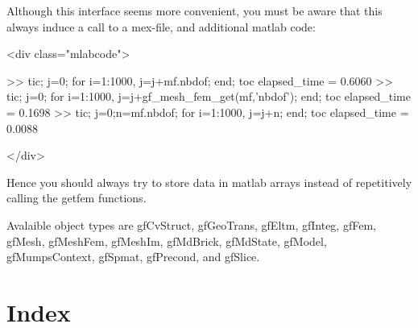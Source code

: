 \documentclass[11pt,a4paper]{article}
\newcommand{\hypertarget}[1]{\label{#1}}
\newcommand{\sf}[1]{#1}
\newenvironment{matlab}{\begin{rawxml}<div class="mlabcode">\end{rawxml}\begin{example}}{\end{example}\begin{rawxml}</div>\end{rawxml}}
\newenvironment{matlab}{\begin{alltt}}{\end{alltt}}
\newcommand{\mlab}{{\sf matlab}\xspace}
\begin{document}
Although this interface seems more convenient, you must be aware that this
always induce a call to a mex-file, and additional \mlab code:
\begin{matlab}
>> tic; j=0; for i=1:1000, j=j+mf.nbdof; end; toc
elapsed_time =
    0.6060
>> tic; j=0; for i=1:1000, j=j+gf_mesh_fem_get(mf,'nbdof'); end; toc
elapsed_time =
    0.1698
>> tic; j=0;n=mf.nbdof;  for i=1:1000, j=j+n; end; toc                           
elapsed_time =
    0.0088
\end{matlab}

Hence you should always try to store data in \mlab arrays instead of repetitively
calling the getfem functions.


Avalaible object types are \hypertarget{gfCvStruct}gfCvStruct, 
\hypertarget{gfGeoTrans}gfGeoTrans,
\hypertarget{gfEltm}gfEltm,
\hypertarget{gfInteg}gfInteg,
\hypertarget{gfFem}gfFem,
\hypertarget{gfMesh}gfMesh,
\hypertarget{gfMeshFem}gfMeshFem,
\hypertarget{gfMeshIm}gfMeshIm,
\hypertarget{gfMdBrick}gfMdBrick,
\hypertarget{gfMdState}gfMdState,
\hypertarget{gfModel}gfModel,
\hypertarget{gfMumpsContext}gfMumpsContext,
\hypertarget{gfSpmat}gfSpmat,
\hypertarget{gfPrecond}gfPrecond,
\hypertarget{gfSlice}and gfSlice.



\W \section*{Index}
\texorhtml{}{\label{gfmindex}\htmlprintindex}
\end{document}
